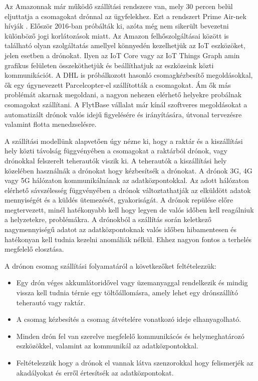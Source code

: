 

Az Amazonnak már működő szállítási rendszere van, mely 30 percen belül eljuttatja a csomagokat drónnal az ügyfelekhez.
Ezt a rendszert Prime Air-nek hívják \cite{prime-air}.
Először 2016-ban próbálták ki, azóta még nem sikerült bevezetni különböző jogi korlátozások miatt.
Az Amazon felhőszolgáltásai között is található olyan szolgáltatás amellyel könnyedén kezelhetjük az IoT eszközöket, jelen esetben a drónokat.
Ilyen az IoT Core vagy az IoT Things Graph amin grafikus felületen összeköthetjük és beállíthatjuk az eszközeink közti kommunikációt.
A DHL is próbálkozott hasonló csomagkézbesítő megoldásokkal, ők egy úgynevezett Parcelcopter-el szállították a csomagokat.
Ám ők más problémát akarnak megoldani, a nagyon nehezen elérhető helyekre probálnak csomagokat szállítani.
A FlytBase \cite{flyt} vállalat már kínál szoftveres megoldásokat a automatizált drónok valós idejű figyelésére és irányítására, útvonal tervezésre valamint flotta menedzselésre.


A szállítási modellünk alapvetően úgy nézne ki, hogy a raktár és a kiszállítási hely közti távolság függvényében a csomagokat a raktárból drónok, vagy drónokkal felszerelt teherautók viszik ki.
A teherautók a kiszállítási hely közelében használnák a drónokat hogy kézbesítsék a drónokat.
A drónok 3G, 4G vagy 5G hálózaton kommunikálnának az adatközpontokkal.
Az adott hálózaton elérhető sávszélesség függvényében a drónok változtathatják az elküldött adatok mennyiségét és a küldés ütemezését, gyakoriságát.
A drónok repülése előre megtervezett, minél hatékonyabb kell hogy legyen de valós időben kell reagálniuk a helyzetekre, problémákra.
A drónokból a szállítás során keletkező nagymennyiségű adatot az adatközpontoknak valós időben hibamentesen és hatékonyan kell tudnia kezelni anomáliák nélkül. Ehhez nagyon fontos a terhelés megfelelő elosztása.

A drónon csomag szállítási folyamatáról a következőket feltételezzük:
\begin{itemize}
    \item Egy drón  véges akkumlátoridővel vagy üzemanyaggal rendelkezik és mindig vissza kell tudnia térnie egy töltőállomásra, amely lehet egy drónszállító teherautó vagy raktár.
    \item A csomag kézbesítés a csomag átvételére vonatkozó ideje elhanyagolható.
    \item Minden drón fel van szerelve megfelelő kommunikácós és helymeghatározó eszközökkel, valamint az kommunikál az adatközpontokkal.
    \item Feltételezzük hogy a drónok el vannak látva szenzorokkal hogy felismerjék az akadályokat és erről értesítsék az adatközpontokat.
\end{itemize}

